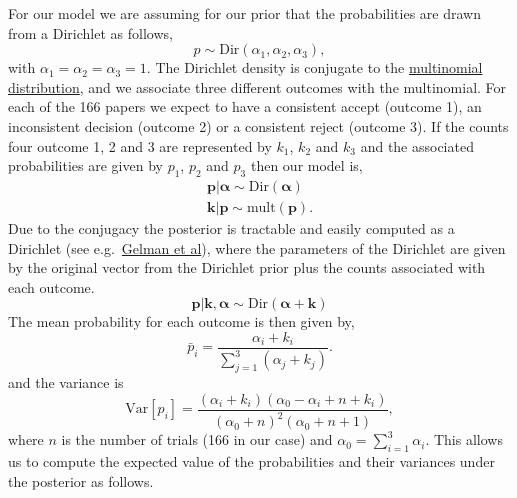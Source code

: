 \documentclass[a4paperpaper,]{article}
\begin{document}
For our model we are assuming for our prior that the probabilities are
drawn from a Dirichlet as follows, \[
p \sim \text{Dir}(\alpha_1, \alpha_2, \alpha_3),
\] with \(\alpha_1=\alpha_2=\alpha_3=1\). The Dirichlet density is
conjugate to the
\href{http://en.wikipedia.org/wiki/Multinomial_distribution}{multinomial
distribution}, and we associate three different outcomes with the
multinomial. For each of the 166 papers we expect to have a consistent
accept (outcome 1), an inconsistent decision (outcome 2) or a consistent
reject (outcome 3). If the counts four outcome 1, 2 and 3 are
represented by \(k_1\), \(k_2\) and \(k_3\) and the associated
probabilities are given by \(p_1\), \(p_2\) and \(p_3\) then our model
is, \begin{align*}
\mathbf{p}|\boldsymbol{\alpha} \sim \text{Dir}(\boldsymbol{\alpha}) \\
\mathbf{k}|\mathbf{p} \sim \text{mult}(\mathbf{p}).
\end{align*} Due to the conjugacy the posterior is tractable and easily
computed as a Dirichlet (see
e.g.~\href{http://www.stat.columbia.edu/~gelman/book/}{Gelman et al}),
where the parameters of the Dirichlet are given by the original vector
from the Dirichlet prior plus the counts associated with each outcome.
\[
\mathbf{p}|\mathbf{k}, \boldsymbol{\alpha} \sim \text{Dir}(\boldsymbol{\alpha} + \mathbf{k})
\] The mean probability for each outcome is then given by, \[
\bar{p}_i = \frac{\alpha_i+k_i}{\sum_{j=1}^3(\alpha_j + k_j)}.
\] and the variance is \[
\mathrm{Var}[p_i] = \frac{(\alpha_i+k_i) (\alpha_0-\alpha_i + n + k_i)}{(\alpha_0+n)^2 (\alpha_0+n+1)},
\] where \(n\) is the number of trials (166 in our case) and
\(\alpha_0 = \sum_{i=1}^3\alpha_i\). This allows us to compute the
expected value of the probabilities and their variances under the
posterior as follows.
\end{document}
